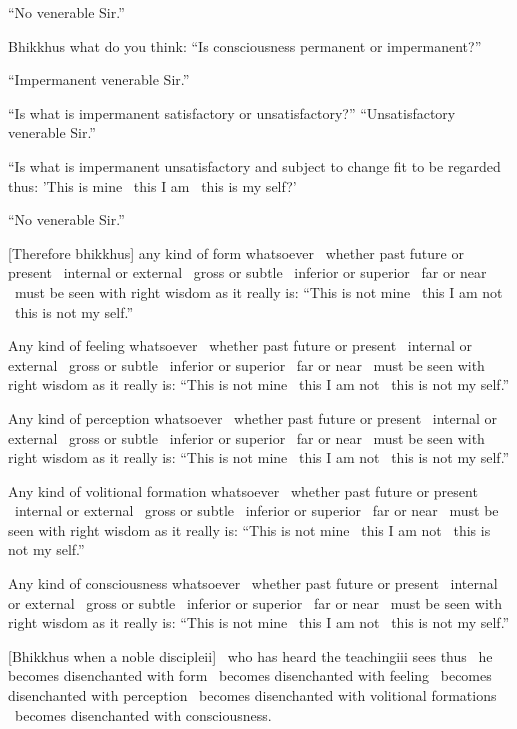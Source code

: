 ``No venerable Sir.''

Bhikkhus what do you think: ``Is consciousness permanent or impermanent?''

``Impermanent venerable Sir.''

``Is what is impermanent satisfactory or unsatisfactory?'' ``Unsatisfactory venerable Sir.''

``Is what is impermanent unsatisfactory and subject to change fit to be regarded thus: 'This is mine \breathmark\ this I am \breathmark\ this is my self?'

``No venerable Sir.''

[Therefore bhikkhus] any kind of form whatsoever \breathmark\ whether past future or present \breathmark\ internal or external \breathmark\ gross or subtle \breathmark\ inferior or superior \breathmark\ far or near \breathmark\ must be seen with right wisdom as it really is: ``This is not mine \breathmark\ this I am not \breathmark\ this is not my self.''

Any kind of feeling whatsoever \breathmark\ whether past future or present \breathmark\ internal or external \breathmark\ gross or subtle \breathmark\ inferior or superior \breathmark\ far or near \breathmark\ must be seen with right wisdom as it really is: ``This is not mine \breathmark\ this I am not \breathmark\ this is not my self.''

Any kind of perception whatsoever \breathmark\ whether past future or present \breathmark\ internal or external \breathmark\ gross or subtle \breathmark\ inferior or superior \breathmark\ far or near \breathmark\ must be seen with right wisdom as it really is: ``This is not mine \breathmark\ this I am not \breathmark\ this is not my self.''

Any kind of volitional formation whatsoever \breathmark\ whether past future or present \breathmark\ internal or external \breathmark\ gross or subtle \breathmark\ inferior or superior \breathmark\ far or near \breathmark\ must be seen with right wisdom as it really is: ``This is not mine \breathmark\ this I am not \breathmark\ this is not my self.''

Any kind of consciousness whatsoever \breathmark\ whether past future or present \breathmark\ internal or external \breathmark\ gross or subtle \breathmark\ inferior or superior \breathmark\ far or near \breathmark\ must be seen with right wisdom as it really is: ``This is not mine \breathmark\ this I am not \breathmark\ this is not my self.''

[Bhikkhus when a noble discipleii] \breathmark\ who has heard the teachingiii sees thus \breathmark\ he becomes disenchanted with form \breathmark\ becomes disenchanted with feeling \breathmark\ becomes disenchanted with perception \breathmark\ becomes disenchanted with volitional formations \breathmark\ becomes disenchanted with consciousness.

